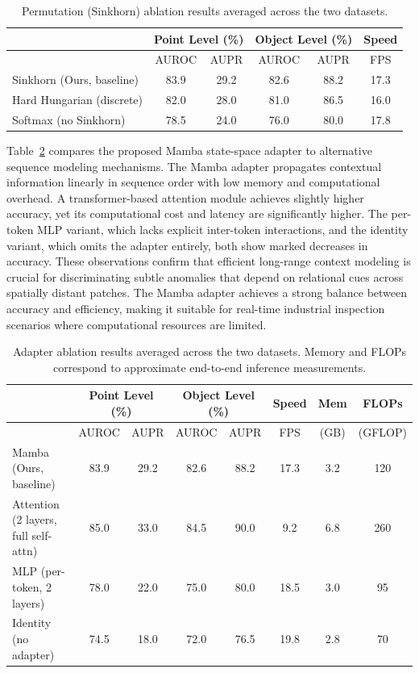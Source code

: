 \begin{table}[ht]
\centering
\caption{Permutation (Sinkhorn) ablation results averaged across the two datasets.}
\label{tab:sinkhorn_ablation}
\begin{tabular}{l|cc|cc|c}
\hline
& \multicolumn{2}{c|}{Point Level (\%)} & \multicolumn{2}{c|}{Object Level (\%)} & Speed \\
\hline
& AUROC & AUPR & AUROC & AUPR & FPS \\  
\hline
Sinkhorn (Ours, baseline) & 83.9 & 29.2 & 82.6 & 88.2 & 17.3 \\
Hard Hungarian (discrete) & 82.0 & 28.0 & 81.0 & 86.5 & 16.0 \\
Softmax (no Sinkhorn) & 78.5 & 24.0 & 76.0 & 80.0 & 17.8 \\
\hline
\end{tabular}
\end{table}

Table~\ref{tab:adapter_ablation} compares the proposed Mamba state-space adapter to alternative sequence modeling mechanisms. The Mamba adapter propagates contextual information linearly in sequence order with low memory and computational overhead. A transformer-based attention module achieves slightly higher accuracy, yet its computational cost and latency are significantly higher. The per-token MLP variant, which lacks explicit inter-token interactions, and the identity variant, which omits the adapter entirely, both show marked decreases in accuracy. These observations confirm that efficient long-range context modeling is crucial for discriminating subtle anomalies that depend on relational cues across spatially distant patches. The Mamba adapter achieves a strong balance between accuracy and efficiency, making it suitable for real-time industrial inspection scenarios where computational resources are limited.

\begin{table}[ht]
\centering
\caption{Adapter ablation results averaged across the two datasets. Memory and FLOPs correspond to approximate end-to-end inference measurements.}
\label{tab:adapter_ablation}
\begin{tabular}{l|cc|cc|c|cc}
\hline
& \multicolumn{2}{c|}{Point Level (\%)} & \multicolumn{2}{c|}{Object Level (\%)} & Speed & Mem & FLOPs \\
\hline
& AUROC & AUPR & AUROC & AUPR & FPS & (GB) & (GFLOP) \\  
\hline
Mamba (Ours, baseline) & 83.9 & 29.2 & 82.6 & 88.2 & 17.3 & 3.2 & 120 \\
Attention (2 layers, full self-attn) & 85.0 & 33.0 & 84.5 & 90.0 & 9.2 & 6.8 & 260 \\
MLP (per-token, 2 layers) & 78.0 & 22.0 & 75.0 & 80.0 & 18.5 & 3.0 & 95 \\
Identity (no adapter) & 74.5 & 18.0 & 72.0 & 76.5 & 19.8 & 2.8 & 70 \\
\hline
\end{tabular}
\end{table}

